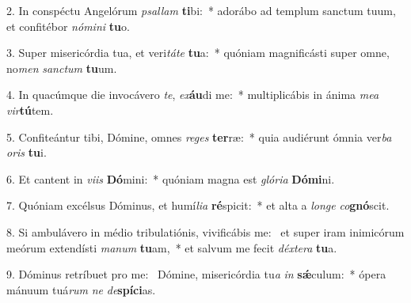 2. In conspéctu Angelórum \textit{psal}\textit{lam} \textbf{ti}bi:~*  adorábo ad templum sanctum tuum, et confitébor \textit{nó}\textit{mi}\textit{ni} \textbf{tu}o.\

3. Super misericórdia tua, et veri\textit{tá}\textit{te} \textbf{tu}a:~*  quóniam magnificásti super omne, no\textit{men} \textit{sanc}\textit{tum} \textbf{tu}um.\

4. In quacúmque die invocávero \textit{te}, \textit{ex}\textbf{áu}di me:~*  multiplicábis in ánima \textit{me}\textit{a} \textit{vir}\textbf{tú}tem.\

5. Confiteántur tibi, Dómine, omnes \textit{re}\textit{ges} \textbf{ter}ræ:~*  quia audiérunt ómnia ver\textit{ba} \textit{o}\textit{ris} \textbf{tu}i.\

6. Et cantent in \textit{vi}\textit{is} \textbf{Dó}mini:~*  quóniam magna est \textit{gló}\textit{ri}\textit{a} \textbf{Dó}\textbf{mi}ni.\

7. Quóniam excélsus Dóminus, et humí\textit{li}\textit{a} \textbf{ré}spicit:~*  et alta a \textit{lon}\textit{ge} \textit{co}\textbf{gnó}scit.\

8. Si ambulávero in médio tribulatiónis, vivificábis me: \dag\  et super iram inimicórum meórum extendísti \textit{ma}\textit{num} \textbf{tu}am,~*  et salvum me fecit \textit{déx}\textit{te}\textit{ra} \textbf{tu}a.\

9. Dóminus retríbuet pro me: \dag\  Dómine, misericórdia tu\textit{a} \textit{in} \textbf{sǽ}culum:~*  ópera mánuum tuá\textit{rum} \textit{ne} \textit{de}\textbf{spí}\textbf{ci}as.\

